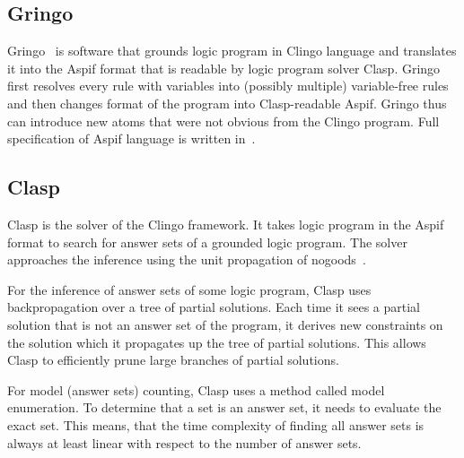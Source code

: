 \subsection{Gringo}

Gringo~\cite{GebserKKS17} is software that grounds logic program in Clingo language
and translates it into the Aspif format that is readable by logic program solver Clasp.
Gringo first resolves every rule with variables
into (possibly multiple) variable-free rules and then changes format of
the program into Clasp-readable Aspif. Gringo thus can introduce new atoms
that were not obvious from the Clingo program. Full specification of Aspif language
is written in~\cite{aspEasy2016}.
\newcommand{\ms}{\texttt{ }}

\subsection{Clasp}\label{sec:clasp}

Clasp is the solver of the Clingo framework. It takes logic program in the Aspif
format to search for answer sets of a grounded logic program.
The solver approaches the inference using the unit propagation
of nogoods~\cite{DBLP:journals/ai/GebserKS12}.

For the inference of answer sets of some logic program,
Clasp uses backpropagation over a tree of partial solutions.
Each time it sees a partial solution that is not an answer set
of the program, it derives new constraints on the solution which it
propagates up the tree of partial solutions. This allows Clasp
to efficiently prune large branches of partial solutions.

For model (answer sets) counting, Clasp uses a method
called model enumeration. To determine that a set is an answer set,
it needs to evaluate the exact set.
This means, that the time complexity
of finding all answer sets is always at least linear with respect to the number of answer sets.
